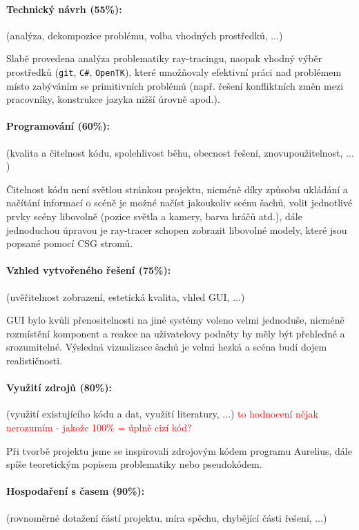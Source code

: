 \documentclass[12pt,a4paper,titlepage,final]{report}
\begin{document}
\paragraph{Technický návrh (55\%):} (analýza, dekompozice problému, volba
vhodných prostředků, $\ldots$) 

Slabě provedena analýza problematiky ray-tracingu, naopak vhodný výběr prostředků (\texttt{git}, \texttt{C\#}, \texttt{OpenTK}), které umožňovaly efektivní práci nad problémem místo zabýváním se primitivních problémů (např. řešení konfliktních změn mezi pracovníky, konstrukce jazyka nižší úrovně apod.).

\paragraph{Programování (60\%):} (kvalita a čitelnost kódu, spolehlivost běhu,
obecnost řešení, znovupoužitelnost, $\ldots$)

Čitelnost kódu není světlou stránkou projektu, nicméně díky způsobu ukládání a načítání informací o scéně je možné načíst jakoukoliv scénu šachů, volit jednotlivé prvky scény libovolně (pozice světla a kamery, barva hráčů atd.), dále jednoduchou úpravou je ray-tracer schopen zobrazit libovolné modely, které jsou popsané pomocí CSG stromů. 


\paragraph{Vzhled vytvořeného řešení (75\%):} (uvěřitelnost zobrazení,
estetická kvalita, vhled GUI, $\ldots$)

GUI bylo kvůli přenositelnosti na jiné systémy voleno velmi jednoduše, nicméně rozmístění komponent a reakce na uživatelovy podněty by měly být přehledné a srozumitelné. Výsledná vizualizace šachů je velmi hezká a scéna budí dojem realističnosti. 

\paragraph{Využití zdrojů (80\%):} (využití existujícího kódu a dat, využití
literatury, $\ldots$)
\textcolor{red}{to hodnocení nějak nerozumím - jakože 100\% = úplně cizí kód?}

Při tvorbě projektu jsme se inspirovali zdrojovým kódem programu Aurelius, dále spíše teoretickým popisem problematiky nebo pseudokódem.

\paragraph{Hospodaření s časem (90\%):} (rovnoměrné dotažení částí projektu,
míra spěchu, chybějící části řešení, $\ldots$)
\end{document}

